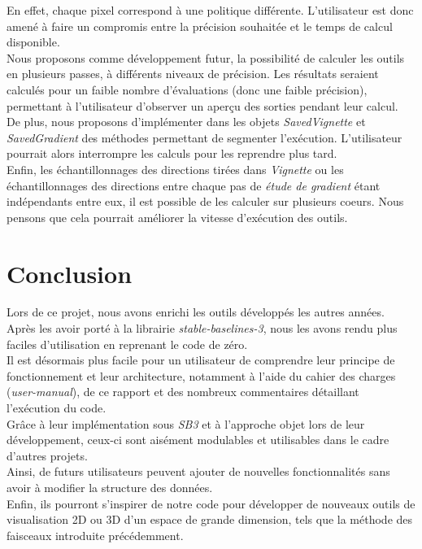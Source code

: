 \documentclass[12pt]{article}
\begin{document}
En effet, chaque pixel correspond à une politique différente. L'utilisateur est donc amené à faire un compromis entre la précision souhaitée et le temps de calcul disponible. \\

Nous proposons comme développement futur, la possibilité de calculer les outils en plusieurs passes, à différents niveaux de précision. Les résultats seraient calculés pour un faible nombre d'évaluations (donc une faible précision), permettant à l'utilisateur d'observer un aperçu des sorties pendant leur calcul. \\

De plus, nous proposons d'implémenter dans les objets \emph{SavedVignette} et \emph{SavedGradient} des méthodes permettant de segmenter l'exécution. L'utilisateur pourrait alors interrompre les calculs pour les reprendre plus tard. \\

Enfin, les échantillonnages des directions tirées dans \emph{Vignette} ou les échantillonnages des directions entre chaque pas de \emph{étude de gradient} étant indépendants entre eux, il est possible de les calculer sur plusieurs coeurs. Nous pensons que cela pourrait améliorer la vitesse d'exécution des outils. \\

\newpage
\section*{Conclusion}

Lors de ce projet, nous avons enrichi les outils développés les autres années. Après les avoir porté à la librairie \emph{stable-baselines-3}, nous les avons rendu plus faciles d'utilisation en reprenant le code de zéro. \\

Il est désormais plus facile pour un utilisateur de comprendre leur principe de fonctionnement et leur architecture, notamment à l'aide du cahier des charges (\emph{user-manual}), de ce rapport et des nombreux commentaires détaillant l'exécution du code. \\

Grâce à leur implémentation sous \emph{SB3} et à l'approche objet lors de leur développement, ceux-ci sont aisément modulables et utilisables dans le cadre d'autres projets. \\

Ainsi, de futurs utilisateurs peuvent ajouter de nouvelles fonctionnalités sans avoir à modifier la structure des données. \\

Enfin, ils pourront s'inspirer de notre code pour développer de nouveaux outils de visualisation 2D ou 3D d'un espace de grande dimension, tels que la méthode des faisceaux introduite précédemment. \\
\end{document}
